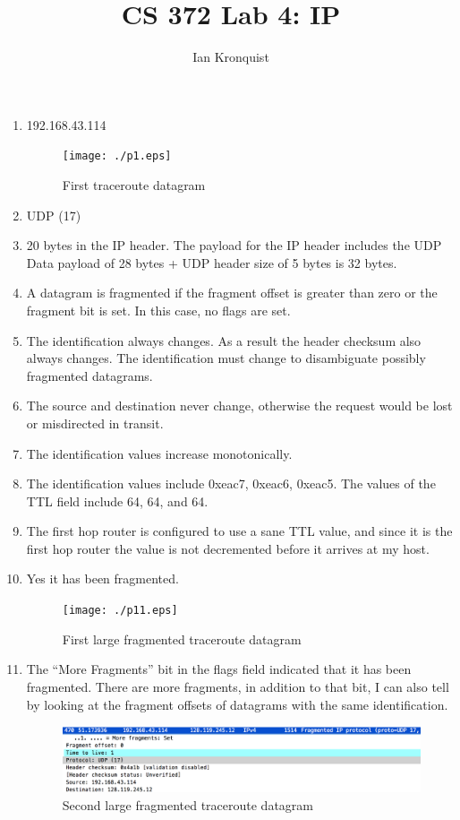 \documentclass[12pt]{article}
\title{CS 372 Lab 4: IP}
\author{Ian Kronquist}
\begin{document}
\maketitle

\begin{enumerate}
    \item 192.168.43.114
        \begin{figure}[!ht]
            \centering
            \texttt{[image: ./p1.eps]}
            \caption{First traceroute datagram}
        \end{figure}
    \item UDP (17)
    \item 20 bytes in the IP header. The payload for the IP header includes the UDP Data payload of 28 bytes + UDP header size of 5 bytes is 32 bytes.
    \item A datagram is fragmented if the fragment offset is greater than zero or the fragment bit is set. In this case, no flags are set.
    \item The identification always changes. As a result the header checksum also always changes. The identification must change to disambiguate possibly fragmented datagrams.
    \item The source and destination never change, otherwise the request would be lost or misdirected in transit.
    \item The identification values increase monotonically.
    \item The identification values include 0xeac7, 0xeac6, 0xeac5. The values of the TTL field include 64, 64, and 64.
    \item The first hop router is configured to use a sane TTL value, and since it is the first hop router the value is not decremented before it arrives at my host.
    \item Yes it has been fragmented.
        \begin{figure}[h]
            \centering
            \texttt{[image: ./p11.eps]}
            \caption{First large fragmented traceroute datagram}
        \end{figure}

    \item The ``More Fragments'' bit in the flags field indicated that it has been fragmented. There are more fragments, in addition to that bit, I can also tell by looking at the fragment offsets of datagrams with the same identification.

        \begin{figure}[h]
            \centering
            \includegraphics[scale=0.5]{./p12.eps}
            \caption{Second large fragmented traceroute datagram}
        \end{figure}




\end{enumerate}
\end{document}
